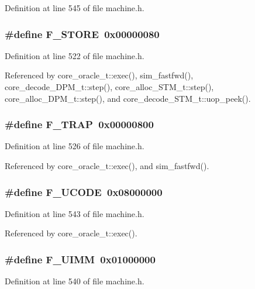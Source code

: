 Definition at line 545 of file machine.h.
\subsubsection[{F\_\-STORE}]{\setlength{\rightskip}{0pt plus 5cm}\#define F\_\-STORE~0x00000080}\label{machine_8h_88eaa4bf4bc810ef90a437971cd5cf9e}




Definition at line 522 of file machine.h.

Referenced by core\_\-oracle\_\-t::exec(), sim\_\-fastfwd(), core\_\-decode\_\-DPM\_\-t::step(), core\_\-alloc\_\-STM\_\-t::step(), core\_\-alloc\_\-DPM\_\-t::step(), and core\_\-decode\_\-STM\_\-t::uop\_\-peek().
\subsubsection[{F\_\-TRAP}]{\setlength{\rightskip}{0pt plus 5cm}\#define F\_\-TRAP~0x00000800}\label{machine_8h_fca5911ccd3348339952f3772240aa24}




Definition at line 526 of file machine.h.

Referenced by core\_\-oracle\_\-t::exec(), and sim\_\-fastfwd().
\subsubsection[{F\_\-UCODE}]{\setlength{\rightskip}{0pt plus 5cm}\#define F\_\-UCODE~0x08000000}\label{machine_8h_d1a033a0796fd0c70c7f3198588584bb}




Definition at line 543 of file machine.h.

Referenced by core\_\-oracle\_\-t::exec().
\subsubsection[{F\_\-UIMM}]{\setlength{\rightskip}{0pt plus 5cm}\#define F\_\-UIMM~0x01000000}\label{machine_8h_ed566491a845d3778dd93eaa2efe6634}




Definition at line 540 of file machine.h.

